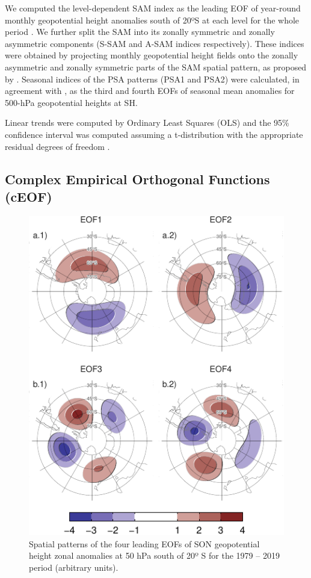 \documentclass[pdflatex,lineno,sn-basic]{sn-jnl}
\theoremstyle{thmstyleone}%
\theoremstyle{thmstyletwo}%
\theoremstyle{thmstylethree}%
\begin{document}
We computed the level-dependent SAM index as the leading EOF of year-round monthly geopotential height anomalies south of 20ºS at each level for the whole period \citep{baldwin2009}.
We further split the SAM into its zonally symmetric and zonally asymmetric components (S-SAM and A-SAM indices respectively).
These indices were obtained by projecting monthly geopotential height fields onto the zonally asymmetric and zonally symmetric parts of the SAM spatial pattern, as proposed by \citet{campitelli2022}.
Seasonal indices of the PSA patterns (PSA1 and PSA2) were calculated, in agreement with \citet{mo2001}, as the third and fourth EOFs of seasonal mean anomalies for 500-hPa geopotential heights at SH.

Linear trends were computed by Ordinary Least Squares (OLS) and the 95\% confidence interval was computed assuming a t-distribution with the appropriate residual degrees of freedom \citep{wilks2011}.

\hypertarget{complex-empirical-orthogonal-functions-ceof}{%
\subsection{Complex Empirical Orthogonal Functions (cEOF)}\label{complex-empirical-orthogonal-functions-ceof}}



\begin{figure}
\centering
\includegraphics{shceof_files/figure-latex/eof-naive-1.pdf}
\caption{\label{fig:eof-naive}Spatial patterns of the four leading EOFs of SON geopotential height zonal anomalies at 50 hPa south of 20º S for the 1979 -- 2019 period (arbitrary units).}
\end{figure}
\end{document}
